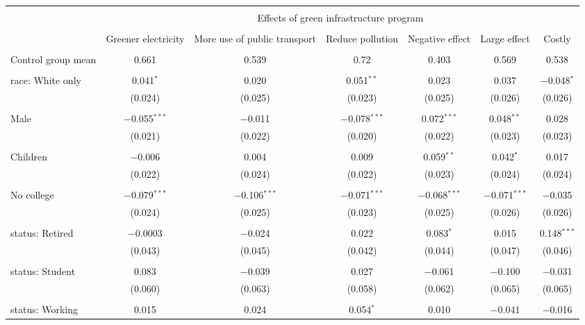 
\begin{tabular}{@{\extracolsep{5pt}}lcccccc} 
\\[-1.8ex]\hline 
\hline \\[-1.8ex] 
 & \multicolumn{6}{c}{Effects of green infrastructure program} \\ 
\cline{2-7} 
\\[-1.8ex] & Greener electricity & More use of public transport & Reduce pollution & Negative effect & Large effect & Costly \\ 
\hline \\[-1.8ex] 
 Control group mean & 0.661 & 0.539 & 0.72 & 0.403 & 0.569 & 0.538  \\ \hline \\[-1.8ex] race: White only & 0.041$^{*}$ & 0.020 & 0.051$^{**}$ & 0.023 & 0.037 & $-$0.048$^{*}$ \\ 
  & (0.024) & (0.025) & (0.023) & (0.025) & (0.026) & (0.026) \\ 
  & & & & & & \\ 
 Male & $-$0.055$^{***}$ & $-$0.011 & $-$0.078$^{***}$ & 0.072$^{***}$ & 0.048$^{**}$ & 0.028 \\ 
  & (0.021) & (0.022) & (0.020) & (0.022) & (0.023) & (0.023) \\ 
  & & & & & & \\ 
 Children & $-$0.006 & 0.004 & 0.009 & 0.059$^{**}$ & 0.042$^{*}$ & 0.017 \\ 
  & (0.022) & (0.024) & (0.022) & (0.023) & (0.024) & (0.024) \\ 
  & & & & & & \\ 
 No college & $-$0.079$^{***}$ & $-$0.106$^{***}$ & $-$0.071$^{***}$ & $-$0.068$^{***}$ & $-$0.071$^{***}$ & $-$0.035 \\ 
  & (0.024) & (0.025) & (0.023) & (0.025) & (0.026) & (0.026) \\ 
  & & & & & & \\ 
 status: Retired & $-$0.0003 & $-$0.024 & 0.022 & 0.083$^{*}$ & 0.015 & 0.148$^{***}$ \\ 
  & (0.043) & (0.045) & (0.042) & (0.044) & (0.047) & (0.046) \\ 
  & & & & & & \\ 
 status: Student & 0.083 & $-$0.039 & 0.027 & $-$0.061 & $-$0.100 & $-$0.031 \\ 
  & (0.060) & (0.063) & (0.058) & (0.062) & (0.065) & (0.065) \\ 
  & & & & & & \\ 
 status: Working & 0.015 & 0.024 & 0.054$^{*}$ & 0.010 & $-$0.041 & $-$0.016 \\ 

\end{tabular}
